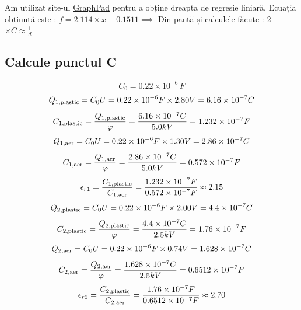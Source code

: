 \documentclass[12pt]{article}
\begin{document}
Am utilizat site-ul \href{https://www.graphpad.com}{GraphPad} pentru a obține dreapta de regresie liniară. Ecuația obținută este : $f = 2.114 \times x + 0.1511 \implies$ Din pantă și calculele făcute : 2 $\times C \approx \frac{1}{d}$\\

\subsection{Calcule punctul C}
\begin{equation}
C_{0} = 0.22 \times 10^{-6} \, F
\end{equation}
\begin{equation}
Q_{1,\text{plastic}} = C_{0}U = 0.22 \times 10^{-6}F \times 2.80V = 6.16 \times 10^{-7}C\\
\end{equation}
\begin{equation}
C_{1,\text{plastic}} = \frac{Q_{1,\text{plastic}}}{\varphi} = \frac{6.16 \times 10^{-7}C}{5.0kV} = 1.232 \times 10^{-7}F\\
\end{equation}
\begin{equation}
Q_{1,\text{aer}} = C_{0}U = 0.22 \times 10^{-6}F \times 1.30V = 2.86 \times 10^{-7}C\\
\end{equation}
\begin{equation}
C_{1,\text{aer}} = \frac{Q_{1,\text{aer}}}{\varphi} = \frac{2.86 \times 10^{-7}C}{5.0kV} = 0.572 \times 10^{-7}F\\
\end{equation}
\begin{equation}
\epsilon_{r1} = \frac{C_{1,\text{plastic}}}{C_{1,\text{aer}}} = \frac{1.232 \times 10^{-7}F}{0.572 \times 10^{-7}F} \approx 2.15\\
\end{equation}
\begin{equation}
Q_{2,\text{plastic}} = C_{0}U = 0.22 \times 10^{-6}F \times 2.00V = 4.4 \times 10^{-7}C\\
\end{equation}
\begin{equation}
C_{2,\text{plastic}} = \frac{Q_{2,\text{plastic}}}{\varphi} = \frac{4.4 \times 10^{-7}C}{2.5kV} = 1.76 \times 10^{-7}F\\
\end{equation}
\begin{equation}
Q_{2,\text{aer}} = C_{0}U = 0.22 \times 10^{-6}F \times 0.74V = 1.628 \times 10^{-7}C\\
\end{equation}
\begin{equation}
C_{2,\text{aer}} = \frac{Q_{2,\text{aer}}}{\varphi} = \frac{1.628 \times 10^{-7}C}{2.5kV} = 0.6512 \times 10^{-7}F\\
\end{equation}
\begin{equation}
\epsilon_{r2} = \frac{C_{2,\text{plastic}}}{C_{2,\text{aer}}} = \frac{1.76 \times 10^{-7}F}{0.6512 \times 10^{-7}F} \approx 2.70\\
\end{equation}
\end{document}
